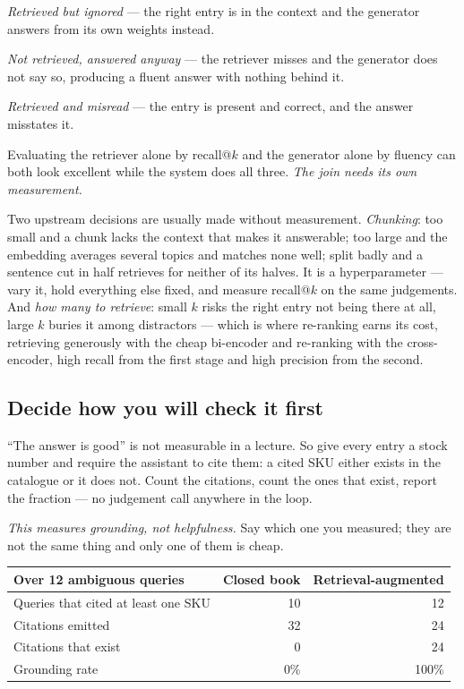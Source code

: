 \documentclass[11pt,a4paper]{article}
\begin{document}
\begin{failbox}[title={Failure condition --- visible from neither half}]
\emph{Retrieved but ignored} --- the right entry is in the context and the
generator answers from its own weights instead.

\emph{Not retrieved, answered anyway} --- the retriever misses and the
generator does not say so, producing a fluent answer with nothing behind it.

\emph{Retrieved and misread} --- the entry is present and correct, and the
answer misstates it.

Evaluating the retriever alone by recall@$k$ and the generator alone by fluency
can both look excellent while the system does all three. \emph{The join needs
its own measurement.}
\end{failbox}

Two upstream decisions are usually made without measurement. \emph{Chunking}:
too small and a chunk lacks the context that makes it answerable; too large and
the embedding averages several topics and matches none well; split badly and a
sentence cut in half retrieves for neither of its halves. It is a
hyperparameter --- vary it, hold everything else fixed, and measure recall@$k$
on the same judgements. And \emph{how many to retrieve}: small $k$ risks the
right entry not being there at all, large $k$ buries it among distractors ---
which is where re-ranking earns its cost, retrieving generously with the cheap
bi-encoder and re-ranking with the cross-encoder, high recall from the first
stage and high precision from the second.

\subsection{Decide how you will check it first}

``The answer is good'' is not measurable in a lecture. So give every entry a
stock number and require the assistant to cite them: a cited SKU either exists
in the catalogue or it does not. Count the citations, count the ones that
exist, report the fraction --- no judgement call anywhere in the loop.

\emph{This measures grounding, not helpfulness.} Say which one you measured;
they are not the same thing and only one of them is cheap.

\begin{center}
\small
\begin{tabular}{lrr}
\toprule
\textbf{Over 12 ambiguous queries} & \textbf{Closed book} &
\textbf{Retrieval-augmented} \\
\midrule
Queries that cited at least one SKU & 10 & 12 \\
Citations emitted & 32 & 24 \\
Citations that exist & 0 & 24 \\
Grounding rate & 0\% & 100\% \\
\bottomrule
\end{tabular}
\end{center}
\end{document}
